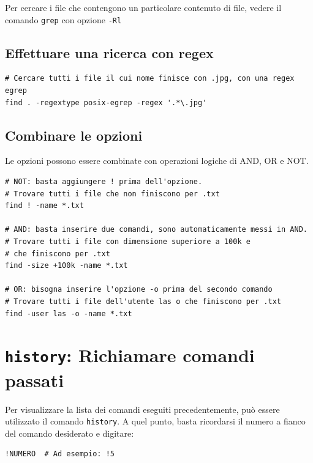 \documentclass[a4paper]{report}
\newenvironment{info}{\begin{tcolorbox}[fonttitle=\sffamily\bfseries\large,title=Info,colframe=blue!75!white]}{\end{tcolorbox}}
\newenvironment{code}{\begin{tcolorbox}[size=small]}{\end{tcolorbox}}
\begin{document}
\begin{info}
Per cercare i file che contengono un particolare contenuto di file, vedere il comando \texttt{grep} con opzione \texttt{-Rl}
\end{info}

\subsection*{Effettuare una ricerca con regex}

\begin{code}
\begin{lstlisting}
# Cercare tutti i file il cui nome finisce con .jpg, con una regex egrep
find . -regextype posix-egrep -regex '.*\.jpg'
\end{lstlisting}
\end{code}

\subsection*{Combinare le opzioni}
Le opzioni possono essere combinate con operazioni logiche di AND, OR e NOT.

\begin{code}
\begin{lstlisting}
# NOT: basta aggiungere ! prima dell'opzione.
# Trovare tutti i file che non finiscono per .txt
find ! -name *.txt

# AND: basta inserire due comandi, sono automaticamente messi in AND.
# Trovare tutti i file con dimensione superiore a 100k e 
# che finiscono per .txt
find -size +100k -name *.txt

# OR: bisogna inserire l'opzione -o prima del secondo comando
# Trovare tutti i file dell'utente las o che finiscono per .txt
find -user las -o -name *.txt
\end{lstlisting}
\end{code}

\section{\texttt{history}: Richiamare comandi passati}
Per visualizzare la lista dei comandi eseguiti precedentemente, può essere utilizzato il comando \texttt{history}. A quel punto, basta ricordarsi il numero a fianco del comando desiderato e digitare:

\begin{lstlisting}
!NUMERO  # Ad esempio: !5
\end{lstlisting}
\end{document}

